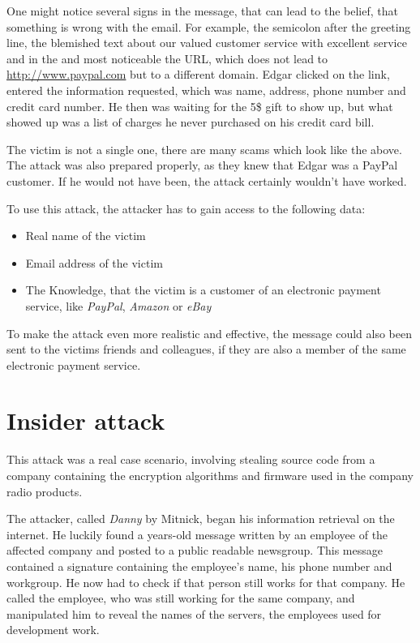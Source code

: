 One might notice several signs in the message, that can lead to the belief,
that something is wrong with the email. For example, the semicolon after the
greeting line, the blemished text about 
\glqq{}our valued customer service with excellent service and in the\grqq{} and
most noticeable the URL, which does not lead to \url{http://www.paypal.com} but
to a different domain. Edgar clicked on the link, entered the information
requested, which was name, address, phone number and credit card number. He
then was waiting for the 5\$ gift to show up, but what showed up was a list of
charges he never purchased on his credit card bill.

The victim is not a single one, there are many scams which look like the above.
The attack was also prepared properly, as they knew that Edgar was a PayPal
customer. If he would not have been, the attack certainly wouldn't have worked.

To use this attack, the attacker has to gain access to the following data: 

\begin{itemize}
  \item Real name of the victim
  \item Email address of the victim
  \item The Knowledge, that the victim is a customer of an electronic payment
  service, like \textit{PayPal}, \textit{Amazon} or \textit{eBay}
\end{itemize}

To make the attack even more realistic and effective, the message could also
been sent to the victims friends and colleagues, if they are also a member of
the same electronic payment service.


\section{Insider attack}

This attack was a real case scenario, involving stealing source code from a
company containing the encryption algorithms and firmware used in the company
radio products.

The attacker, called \textit{Danny} by Mitnick, began his information retrieval
on the internet. He luckily found a years-old message written by an employee of
the affected company and posted to a public readable newsgroup. This message
contained a signature containing the employee's name, his phone number and
workgroup. He now had to check if that person still works for that company. He
called the employee, who was still working for the same company, and
manipulated him to reveal the names of the servers, the employees used for
development work.

